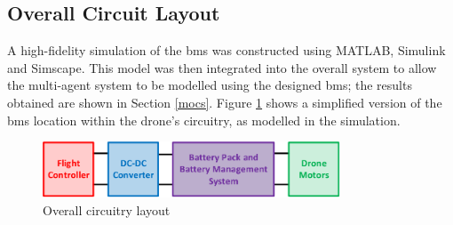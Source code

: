 \subsection{Overall Circuit Layout}

A high-fidelity simulation of the \gls{bms} was constructed using MATLAB, Simulink and Simscape. This model was then integrated into the overall system to allow the multi-agent system to be modelled using the designed \gls{bms}; the results obtained are shown in Section \ref{mocs}. Figure \ref{fig:bms_ovrlayout} shows a simplified version of the \gls{bms} location within the drone's circuitry, as modelled in the simulation.

\begin{figure}[H]
  \centering
  \includegraphics[width=0.79\textwidth]{figs/Samuel/Figures/BMS-cropped.pdf}
  \caption{Overall circuitry layout}
  \label{fig:bms_ovrlayout}
\end{figure}


